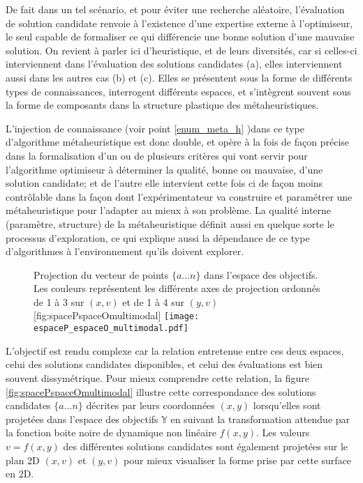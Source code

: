 De fait dans un tel scénario, et pour éviter une recherche aléatoire, l'évaluation de solution candidate renvoie à l'existence d'une expertise externe à l'optimiseur, le seul capable de formaliser ce qui différencie une bonne solution d'une mauvaise solution. On revient à parler ici d'heuristique, et de leurs diversités, car si celles-ci interviennent dans l'évaluation des solutions candidates (a), elles interviennent aussi dans les autres cas (b) et (c). Elles se présentent sous la forme de différents types de connaissances, interrogent différents espaces, et s'intègrent souvent sous la forme de composants dans la structure plastique des métaheuristiques.

L'injection de connaissance (voir point \ref{enum_meta_h} )dans ce type d'algorithme métaheuristique est donc double, et opère à la fois de façon précise dans la formalisation d'un ou de plusieurs critères qui vont servir pour l'algorithme optimiseur à déterminer la qualité, bonne ou mauvaise, d'une solution candidate; et de l'autre elle intervient cette fois ci de façon moins contrôlable dans la façon dont l'expérimentateur va construire et paramétrer une métaheuristique pour l'adapter au mieux à son problème. La qualité interne (paramètre, structure) de la métaheuristique définit aussi en quelque sorte le processus d'exploration, ce qui explique aussi la dépendance de ce type d'algorithmes à l'environnement qu'ils doivent explorer.

\begin{figure}[ht]
	\begin{sidecaption}[fortoc]{Projection du vecteur de points $\{a \dotsc n\}$ dans l'espace des objectifs. Les couleurs représentent les différents axes de projection ordonnés de 1 à 3 sur $(x,v)$ et de 1 à 4 sur $(y,v)$}[fig:spacePspaceOmultimodal]
	 \centering
	 	\texttt{[image: espaceP\_espaceO\_multimodal.pdf]}
	\end{sidecaption}
\end{figure}

L'objectif est rendu complexe car la relation entretenue entre ces deux espaces, celui des solutions candidates disponibles, et celui des évaluations est bien souvent dissymétrique. Pour mieux comprendre cette relation, la figure \ref{fig:spacePspaceOmultimodal} illustre cette correspondance des solutions candidates $\{a \dotsc n\}$ décrites par leurs coordonnées $(x,y)$ lorsqu'elles sont projetées dans l'espace des objectifs $\mathbb{Y}$ en suivant la transformation attendue par la fonction boite noire de dynamique non linéaire $f(x,y)$. Les valeurs $v = f(x,y)$ des différentes solutions candidates sont également projetées sur le plan 2D $(x,v)$ et $(y,v)$ pour mieux visualiser la forme prise par cette surface en 2D.

